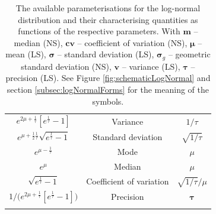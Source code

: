 {\begin{center}
\begin{longtable}{ccc}
 $e^{2\mu + \frac{1}{\tau}}[e^{\frac{1}{\tau}}-1]$ & Variance 			& $1/\tau$	\\ [0ex]
$e^{\mu + \frac{1}{2} \frac{1}{\tau}}\sqrt{e^{\frac{1}{\tau}}-1}$ 	& Standard deviation & $\sqrt{1/\tau}$	\\ [0ex]
 $e^{\mu - \frac{1}{\tau}}$					& Mode 					& $\mu$	\\ [0ex]
 $e^\mu$								& Median					& $\mu$ \\ [0ex]
$\sqrt{e^{\frac{1}{\tau}}-1}$				& Coefficient of variation		& $\sqrt{1/\tau} / \mu$ \\ [0EX]
  $1/\big(e^{2\mu + \frac{1}{\tau}}[e^{\frac{1}{\tau}}-1]\big)$ & Precision				& $\boldsymbol\tau$ \\ [0ex]
   \hline
\caption{The available parameterisations for the log-normal distribution and their characterising 
quantities as functions of the respective parameters. With $\boldsymbol m$ -- median (NS), 
$\boldsymbol {cv}$ -- coefficient of variation (NS), $\boldsymbol \mu$ -- mean (LS), 
$\boldsymbol \sigma$ -- standard deviation (LS), $\boldsymbol \sigma_g$ -- geometric standard 
deviation (NS), $\boldsymbol v$ -- variance (LS), 
$\boldsymbol \tau$ -- precision (LS). See Figure \ref{fig:schematicLogNormal} and 
section \ref{subsec:logNormalForms} for the meaning of the symbols.
}
\label{figTable:logNormalParameterisations}
\vspace{-3.5em}
\end{longtable}
\end{center}

\setlength{\tabcolsep}{1em}

\newpage 

}
